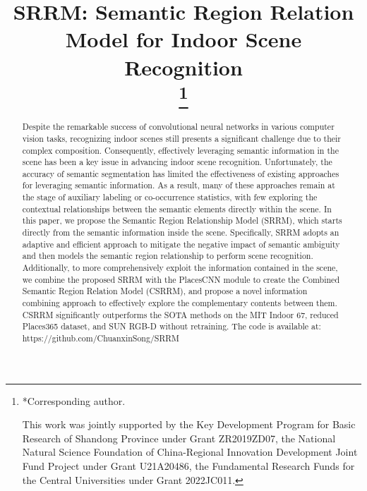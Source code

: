 \documentclass[conference]{IEEEtran}
\begin{document}
\title{SRRM: Semantic Region Relation Model for Indoor Scene Recognition\\
\thanks{*Corresponding author.

This work was jointly supported by the Key Development Program for Basic Research of Shandong Province under Grant ZR2019ZD07, the National Natural Science Foundation of China-Regional Innovation Development Joint Fund Project under Grant U21A20486, the Fundamental Research Funds for the Central Universities under Grant 2022JC011.}
}

\author{
\and
{}
}

\maketitle

\begin{abstract}
Despite the remarkable success of convolutional neural networks in various computer vision tasks, recognizing indoor scenes still presents a significant challenge due to their complex composition. Consequently, effectively leveraging semantic information in the scene has been a key issue in advancing indoor scene recognition. Unfortunately, the accuracy of semantic segmentation has limited the effectiveness of existing approaches for leveraging semantic information. As a result, many of these approaches remain at the stage of auxiliary labeling or co-occurrence statistics, with few exploring the contextual relationships between the semantic elements directly within the scene. In this paper, we propose the Semantic Region Relationship Model (SRRM), which starts directly from the semantic information inside the scene. Specifically, SRRM adopts an adaptive and efficient approach to mitigate the negative impact of semantic ambiguity and then models the semantic region relationship to perform scene recognition. Additionally, to more comprehensively exploit the information contained in the scene, we combine the proposed SRRM with the PlacesCNN module to create the Combined Semantic Region Relation Model (CSRRM), and propose a novel information combining approach to effectively explore the complementary contents between them. CSRRM significantly outperforms the SOTA methods on the MIT Indoor 67, reduced Places365 dataset, and SUN RGB-D without retraining. The code is available at: https://github.com/ChuanxinSong/SRRM
\end{abstract}
\end{document}

